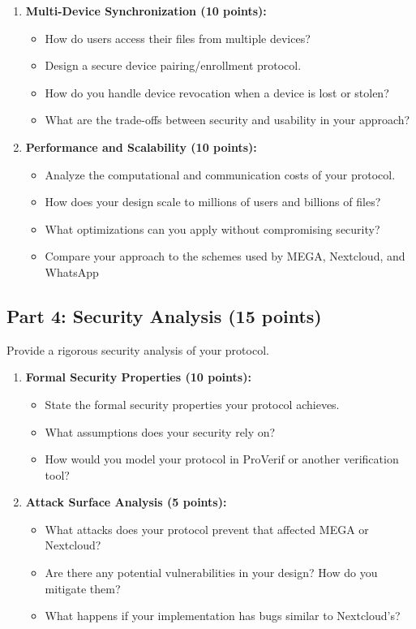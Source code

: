 \documentclass[10pt,a4paper,american]{article}
\begin{document}
\begin{enumerate}
	\item \textbf{Multi-Device Synchronization (10 points):}
	      \begin{itemize}
		      \item How do users access their files from multiple devices?
		      \item Design a secure device pairing/enrollment protocol.
		      \item How do you handle device revocation when a device is lost or stolen?
		      \item What are the trade-offs between security and usability in your approach?
	      \end{itemize}

	\item \textbf{Performance and Scalability (10 points):}
	      \begin{itemize}
		      \item Analyze the computational and communication costs of your protocol.
		      \item How does your design scale to millions of users and billions of files?
		      \item What optimizations can you apply without compromising security?
		      \item Compare your approach to the schemes used by MEGA, Nextcloud, and WhatsApp
	      \end{itemize}
\end{enumerate}

\subsection{Part 4: Security Analysis (15 points)}

Provide a rigorous security analysis of your protocol.

\begin{enumerate}
	\item \textbf{Formal Security Properties (10 points):}
	      \begin{itemize}
		      \item State the formal security properties your protocol achieves.
		      \item What assumptions does your security rely on?
		      \item How would you model your protocol in ProVerif or another verification tool?
	      \end{itemize}

	\item \textbf{Attack Surface Analysis (5 points):}
	      \begin{itemize}
		      \item What attacks does your protocol prevent that affected MEGA or Nextcloud?
		      \item Are there any potential vulnerabilities in your design? How do you mitigate them?
		      \item What happens if your implementation has bugs similar to Nextcloud's?
	      \end{itemize}
\end{enumerate}
\end{document}
